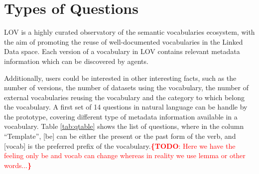 \documentclass[runningheads,a4paper]{llncs}
\newcommand{\todo}[1]{\noindent\textcolor{red}{{\bf \{TODO}: #1{\bf \}}}}
\begin{document}
\section{Types of Questions}
\label{sec:questions}

LOV is a highly curated observatory of the semantic vocabularies ecosystem, with the aim of promoting the reuse of well-documented vocabularies in the Linked Data space. Each version of a vocabulary in LOV contains relevant metadata information which can be discovered by agents. 

Additionally, users could be interested in other interesting facts, such as the number of versions, the number of datasets  using the vocabulary, the number of external vocabularies reusing the vocabulary and the category to which belong the vocabulary. A first set of 14 questions in natural language can be handle by the prototype, covering different type of metadata information available in a vocabulary. Table \ref{tab:qtable} shows the list of questions, where in the column ``Template'', [be] can be either the present or the past form of the verb, and [vocab] is the preferred prefix of the vocabulary.\todo{Here we have the feeling only be and vocab can change whereas in reality we use lemma or other words...}    
\end{document}
